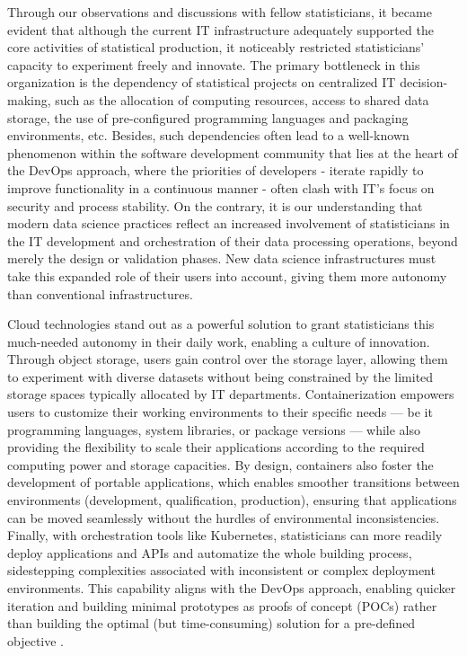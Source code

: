 Through our observations and discussions with fellow statisticians, it became evident that although the current IT infrastructure adequately supported the core activities of statistical production, it noticeably restricted statisticians' capacity to experiment freely and innovate. The primary bottleneck in this organization is the dependency of statistical projects on centralized IT decision-making, such as the allocation of computing resources, access to shared data storage, the use of pre-configured programming languages and packaging environments, etc. Besides, such dependencies often lead to a well-known phenomenon within the software development community that lies at the heart of the DevOps approach, where the priorities of developers - iterate rapidly to improve functionality in a continuous manner - often clash with IT's focus on security and process stability. On the contrary, it is our understanding that modern data science practices reflect an increased involvement of statisticians in the IT development and orchestration of their data processing operations, beyond merely the design or validation phases. New data science infrastructures must take this expanded role of their users into account, giving them more autonomy than conventional infrastructures.

Cloud technologies stand out as a powerful solution to grant statisticians this much-needed autonomy in their daily work, enabling a culture of innovation. Through object storage, users gain control over the storage layer, allowing them to experiment with diverse datasets without being constrained by the limited storage spaces typically allocated by IT departments. Containerization empowers users to customize their working environments to their specific needs — be it programming languages, system libraries, or package versions — while also providing the flexibility to scale their applications according to the required computing power and storage capacities. By design, containers also foster the development of portable applications, which enables smoother transitions between environments (development, qualification, production), ensuring that applications can be moved seamlessly without the hurdles of environmental inconsistencies. Finally, with orchestration tools like Kubernetes, statisticians can more readily deploy applications and APIs and automatize the whole building process, sidestepping complexities associated with inconsistent or complex deployment environments. This capability aligns with the DevOps approach, enabling quicker iteration and building minimal prototypes as proofs of concept (POCs) rather than building the optimal (but time-consuming) solution for a pre-defined objective \cite{leite2019survey}.

